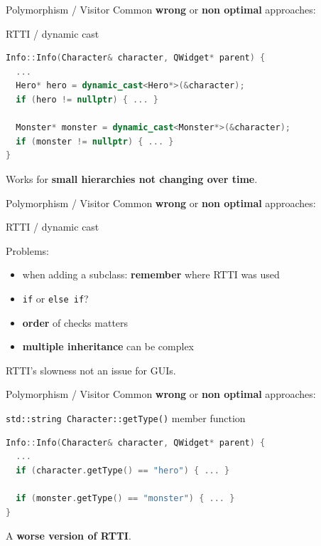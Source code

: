 \documentclass[11pt]{beamer}
\renewcommand{\emph}[1]{\textbf{#1}}
\begin{document}
\begin{frame}[fragile]{Polymorphism / Visitor}
 Common \emph{wrong} or \emph{non optimal} approaches:
 
 \begin{center}
  RTTI / dynamic cast
 \end{center}
 
 \begin{lstlisting}[language=C++]
Info::Info(Character& character, QWidget* parent) {
  ...
  Hero* hero = dynamic_cast<Hero*>(&character);
  if (hero != nullptr) { ... }
  
  Monster* monster = dynamic_cast<Monster*>(&character);
  if (monster != nullptr) { ... }
}
\end{lstlisting}
 
 Works for \emph{small hierarchies not changing over time}.
\end{frame}

\begin{frame}{Polymorphism / Visitor}
 Common \emph{wrong} or \emph{non optimal} approaches:
 
 \begin{center}
  RTTI / dynamic cast
 \end{center}
 
 Problems:
 \begin{itemize}
  \item when adding a subclass: \emph{remember} where RTTI was used
  \item \texttt{if} or \texttt{else if}?
  \item \emph{order} of checks matters
  \item \emph{multiple inheritance} can be complex
 \end{itemize}
 
 RTTI's slowness not an issue for GUIs.
\end{frame}

\begin{frame}[fragile]{Polymorphism / Visitor}
 Common \emph{wrong} or \emph{non optimal} approaches:
 
 \begin{center}
  \texttt{std::string Character::getType()} member function
 \end{center}
 
 \begin{lstlisting}[language=C++]
Info::Info(Character& character, QWidget* parent) {
  ...
  if (character.getType() == "hero") { ... }
  
  if (monster.getType() == "monster") { ... }
}
\end{lstlisting}
 
 A \emph{worse version of RTTI}.
\end{frame}
\end{document}

